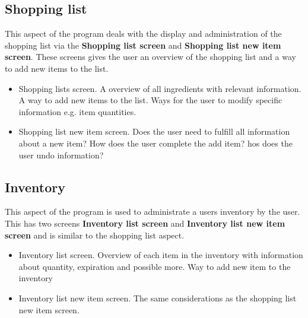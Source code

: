 \subsection{Shopping list}
This aspect of the program deals with the display and administration of the shopping list via the \textbf{Shopping list screen} and \textbf{Shopping list new item screen}. These screens gives the user an overview of the shopping list and a way to add new items to the list.

\begin{itemize}
	\item Shopping lists screen.
		\subitem A overview of all ingredients with relevant information.
		\subitem A way to add new items to the list.
		\subitem Ways for the user to modify specific information e.g. item quantities.
	\item Shopping list new item screen.
		\subitem Does the user need to fulfill all information about a new item?
		\subitem How does the user complete the add item?
		\subitem hos does the user undo information? 
\end{itemize}

\subsection{Inventory}
This aspect of the program is used to administrate a users inventory by the user. This has two screens
\textbf{Inventory list screen} and \textbf{Inventory list new item screen} and is similar to the shopping list aspect. 
    
\begin{itemize}
	\item Inventory list screen.
		\subitem Overview of each item in the inventory with information about quantity, expiration and possible more.
		\subitem Way to add new item to the inventory
	\item Inventory list new item screen.
		\subitem The same considerations as the shopping list new item screen.
\end{itemize}


